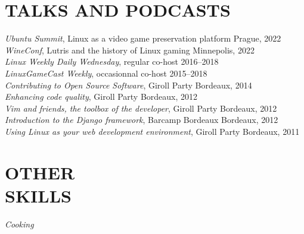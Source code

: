 \documentclass[line,resmargin]{res}
\begin{document}
\begin{resume}
\section{TALKS AND PODCASTS}
    {\sl Ubuntu Summit}, Linux as a video game preservation platform \hfill Prague, 2022 \\
    {\sl WineConf}, Lutris and the history of Linux gaming \hfill Minnepolis, 2022  \\
    {\sl Linux Weekly Daily Wednesday}, regular co-host \hfill 2016--2018 \\
    {\sl LinuxGameCast Weekly}, occasionnal co-host \hfill 2015--2018 \\
    {\sl Contributing to Open Source Software},  Giroll Party \hfill Bordeaux, 2014 \\
    {\sl Enhancing code quality}, Giroll Party \hfill Bordeaux, 2012 \\
    {\sl Vim and friends, the toolbox of the developer}, Giroll Party \hfill Bordeaux, 2012 \\
    {\sl Introduction to the Django framework}, Barcamp Bordeaux \hfill Bordeaux, 2012 \\
    {\sl Using Linux as your web development environment}, Giroll Party \hfill Bordeaux, 2011

\section{OTHER \\ SKILLS}
    {\sl Cooking}

\end{resume}
\end{document}
